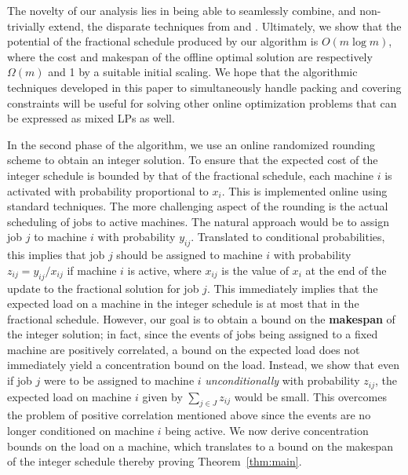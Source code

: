 \documentclass[11pt]{article}
\begin{document}
The novelty of our analysis lies in being able to seamlessly combine, and
non-trivially extend, the disparate 
techniques from \cite{AlonAABN09} and \cite{AspnesAFPW97}.
Ultimately, we show that the potential of the fractional schedule 
produced by our algorithm is $O(m\log m)$, where the cost and makespan
of the offline optimal solution are respectively $\Omega(m)$ and 1 by 
a suitable initial scaling. We hope that the algorithmic 
techniques developed in this paper to simultaneously handle packing and
covering constraints will be useful for solving other online optimization 
problems that can be expressed as mixed LPs as well. 

In the second phase of the algorithm, we use an online randomized rounding scheme 
to obtain an integer solution. To ensure that the expected cost of 
the integer schedule is bounded by that of the fractional schedule, each machine $i$ 
is activated with probability proportional to $x_i$. This is implemented online using 
standard techniques. The more challenging aspect of the rounding is the actual 
scheduling of jobs to active machines. The natural approach would be to assign 
job $j$ to machine $i$ with probability $y_{ij}$. 
Translated to conditional probabilities, this implies
that job $j$ should be assigned to machine $i$ with probability $z_{ij} = y_{ij}/x_{ij}$
if machine $i$ is active, where $x_{ij}$ is the value of $x_i$ at the end of the
update to the fractional solution for job $j$. This immediately implies that the expected
load on a machine in the integer schedule is at most that in the fractional schedule. 
However, our goal is to obtain a bound
on the {\bf makespan} of the integer solution; in fact, since the events of 
jobs being assigned to a fixed machine are positively
correlated, a bound on the expected load does not immediately
yield a concentration bound on the load. Instead, we show that even if job $j$ 
were to be assigned to machine $i$ {\em unconditionally} with probability $z_{ij}$,
the expected load on machine $i$ given by $\sum_{j\in J} z_{ij}$ would be small. 
This overcomes the problem of positive correlation mentioned above since the events are 
no longer conditioned on machine $i$ being active. We now derive
concentration bounds on the load on a machine, which translates to a bound on the 
makespan of the integer schedule thereby proving Theorem~\ref{thm:main}.

\noindent
\end{document}
